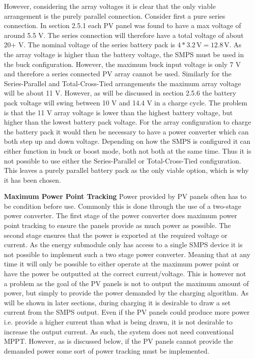 \documentclass[a4paper]{article}
\newcommand{\unit}[1]{\ensuremath{\, \mathrm{#1}}}
\begin{document}
However, considering the array voltages it is clear that the only viable arrangement 
is the purely parallel connection. Consider first a pure series connection. In 
section 2.5.1 each PV panel was found to have a max voltage of around 5.5 V. 
The series connection will therefore have a total voltage of about 20+ V. 
The nominal voltage of the series battery pack is \(4 * 3.2 \unit{V} = 12.8 \unit{V} \). 
As the array voltage is higher than the battery voltage, the SMPS must 
be used in the buck configuration. However, the maximum buck input voltage 
is only 7 V\cite{PMOS} and therefore a series connected PV array 
cannot be used. Similarly for the Series-Parallel and Total-Cross-Tied 
arrangements the maximum array voltage will be about 11 V. However, 
as will be discussed in section 2.5.6 the battery pack voltage will 
swing between 10 V and 14.4 V in a charge cycle. The problem is that 
the 11 V array voltage is lower than the highest battery voltage, but
    higher than the lowest battery pack voltage. For the array configuration
to charge the battery pack it would then be necessary to have a power
converter which can both step up and down voltage. Depending on how the 
SMPS is configured it can either function in buck or boost mode, both not 
both at the same time. Thus it is not possible to use either the Series-Parallel
or Total-Cross-Tied configuration. This leaves a purely parallel battery 
pack as the only viable option, which is why it has been chosen. 

\textbf{Maximum Power Point Tracking}
\vspace{10pt} 
\newline
Power provided by PV panels often has to be condition before use. Commonly this 
is done through the use of a two-stage power converter. The first stage of the power
converter does maximum power point tracking to ensure the panels provide as 
much power as possible. The second stage ensures that the power is exported at the
required voltage or current\cite{green}. As the energy submodule only has
access to a single SMPS device it is not possible to implement such a two stage
power converter. Meaning that at any time it will only be possible to either operate 
at the maximum power point or have the power be outputted at the correct current/voltage.
This is however not a problem as the goal of the PV panels is not to output the 
maximum amount of power, but simply to provide the power demanded by the charging algorithm. 
As will be shown in later sections, during charging it is desirable to draw a set
current from the SMPS output. Even if the PV panels could produce more power i.e.
provide a higher current than what is being drawn, it is not desirable to increase 
the output current. As such, the system does not need conventional MPPT. However,
as is discussed below, if the PV panels cannot provide the demanded power some sort 
of power tracking must be implemented. 
\end{document}
